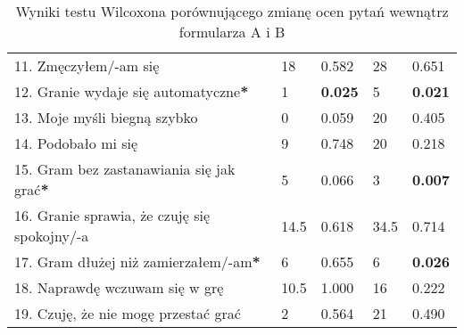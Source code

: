 \begin{table}[h!]
\begin{center}
\begin{tabular}{|m{10em}|m{5em}|m{5em}|m{5em}|m{5em}|}
            11. Zmęczyłem/-am się                                             & 18                     & 0.582          & 28                     & 0.651          \\
            12. Granie wydaje się automatyczne\textbf{*}                      & 1                      & \textbf{0.025} & 5                      & \textbf{0.021} \\
            13. Moje myśli \newline biegną szybko                             & 0                      & 0.059          & 20                     & 0.405          \\
            14. Podobało mi się                                               & 9                      & 0.748          & 20                     & 0.218          \\
            15. Gram bez zastanawiania się jak grać\textbf{*}                 & 5                      & 0.066          & 3                      & \textbf{0.007} \\
            16. Granie sprawia, \newline że czuję się spokojny/-a             & 14.5                   & 0.618          & 34.5                   & 0.714          \\
            17. Gram dłużej \newline niż zamierzałem/-am\textbf{*}            & 6                      & 0.655          & 6                      & \textbf{0.026} \\
            18. Naprawdę wczuwam się w grę                                    & 10.5                   & 1.000          & 16                     & 0.222          \\
            19. Czuję, że nie mogę przestać grać                              & 2                      & 0.564          & 21                     & 0.490          \\
            \hline
        \end{tabular}
    \end{center}
    \caption{Wyniki testu Wilcoxona porównującego zmianę ocen pytań wewnątrz formularza A i B}\label{tab1:ch7_13}
\end{table}


